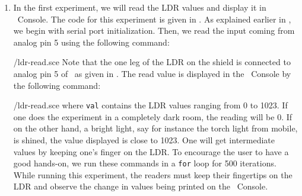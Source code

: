 \begin{enumerate}
\item In the first experiment, we will read the LDR values and display it in 
\scilab\ Console. The code for this experiment is 
given in  . As explained earlier in , 
we begin with serial port initialization. Then, we read the input coming from
analog pin 5 using the following command:  

  {\LocLDRscicode/ldr-read.sce}
  Note that the one leg of the LDR on
  the shield is connected to analog pin 5 of \arduino\, 
  as given in . The read value is displayed in the 
  \scilab\ Console by the following command: 
  
  {\LocLDRscicode/ldr-read.sce} where {\tt val} contains
  the LDR values ranging from 0 to 1023. If one does the experiment in a completely dark room, the
  reading will be 0. If on the other hand, a bright light, say for instance the torch
  light from mobile, is shined, the value displayed is close to 1023. One will get
  intermediate values by keeping one’s finger on the LDR. To
  encourage the user to have a good hands-on, we run these commands in
  a {\tt for} loop for 500 iterations. While running this experiment, the readers must keep their fingertips on the LDR and
  observe the change in values being printed on the \scilab\ Console. 




\end{enumerate}
